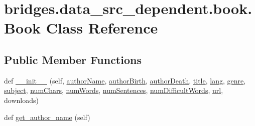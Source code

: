 \hypertarget{classbridges_1_1data__src__dependent_1_1book_1_1_book}{}\section{bridges.\+data\+\_\+src\+\_\+dependent.\+book.\+Book Class Reference}
\label{classbridges_1_1data__src__dependent_1_1book_1_1_book}
\subsection*{Public Member Functions}
\begin{DoxyCompactItemize}
\item 
def \mbox{\hyperlink{classbridges_1_1data__src__dependent_1_1book_1_1_book_aec4c365cdf13b6f90035e002e21ab448}{\+\_\+\+\_\+init\+\_\+\+\_\+}} (self, \mbox{\hyperlink{classbridges_1_1data__src__dependent_1_1book_1_1_book_ad9b615044dbe1130c831bf2ce9e40e9e}{author\+Name}}, \mbox{\hyperlink{classbridges_1_1data__src__dependent_1_1book_1_1_book_aa27ec6e0e5bb10ce9e6e3133a41419d6}{author\+Birth}}, \mbox{\hyperlink{classbridges_1_1data__src__dependent_1_1book_1_1_book_af8088a52ba21e1bc6a4b818d98144ebc}{author\+Death}}, \mbox{\hyperlink{classbridges_1_1data__src__dependent_1_1book_1_1_book_a3f3a5222313c5550fba6f78d9c94dd40}{title}}, \mbox{\hyperlink{classbridges_1_1data__src__dependent_1_1book_1_1_book_a151964bd1255904b4da128ced2258938}{lang}}, \mbox{\hyperlink{classbridges_1_1data__src__dependent_1_1book_1_1_book_ab370cb529de13f728326dc1e9dd9224d}{genre}}, \mbox{\hyperlink{classbridges_1_1data__src__dependent_1_1book_1_1_book_a76a1f4fd58fdebd2095e373253124ea2}{subject}}, \mbox{\hyperlink{classbridges_1_1data__src__dependent_1_1book_1_1_book_a82c31e42078419f344cabd469f8104f7}{num\+Chars}}, \mbox{\hyperlink{classbridges_1_1data__src__dependent_1_1book_1_1_book_a642e959cae3e1fc7f0a50070033a3062}{num\+Words}}, \mbox{\hyperlink{classbridges_1_1data__src__dependent_1_1book_1_1_book_a46fe504c3720e8d6fe779e6c9d2f5679}{num\+Sentences}}, \mbox{\hyperlink{classbridges_1_1data__src__dependent_1_1book_1_1_book_a51a87f819875c25e5f3164cf54eedf33}{num\+Difficult\+Words}}, \mbox{\hyperlink{classbridges_1_1data__src__dependent_1_1book_1_1_book_a786ef9922b8aab860dd84cc0be2b437e}{url}}, downloads)
\item 
def \mbox{\hyperlink{classbridges_1_1data__src__dependent_1_1book_1_1_book_a8ac8b3a4d3494b4e4733d6f2999025c7}{get\+\_\+author\+\_\+name}} (self)
\item 

\end{DoxyCompactItemize}

